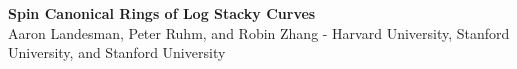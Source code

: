 \documentclass[a0,landscape, draft]{a0poster}
\theoremstyle{definition}
\begin{document}
	\begin{center}
		\begin{minipage}[b]{\linewidth}
	\begin{center}
			\veryHuge \color{emoryBlue} \textbf{Spin Canonical Rings of Log Stacky Curves} \color{black}\\ 
			\Large Aaron Landesman, Peter Ruhm, and Robin Zhang \hskip 1cm - \hskip 1cm Harvard University, Stanford University, and Stanford University \\
		\end{center}
		\end{minipage}
	\end{center}
	\vspace{1cm} 
\end{document}
